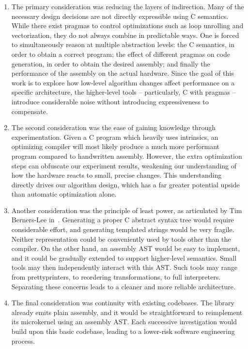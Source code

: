 \begin{enumerate}

\item The primary consideration was reducing the layers of indirection. Many of the necessary design decisions are not directly expressible using C semantics. While there exist pragmas to control optimizations such as loop unrolling and vectorization, they do not always combine in predictable ways. One is forced to simultaneously reason at multiple abstraction levels: the C semantics, in order to obtain a correct program; the effect of different pragmas on code generation, in order to obtain the desired assembly; and finally the performance of the assembly on the actual hardware. Since the goal of this work is to explore how low-level algorithm changes affect performance on a specific architecture, the higher-level tools -- particularly, C with pragmas -- introduce considerable noise without introducing expressiveness to compensate.

\item The second consideration was the ease of gaining knowledge through experimentation. Given a C program which heavily uses intrinsics, an optimizing compiler will most likely produce a much more performant program compared to handwritten assembly. However, the extra optimization steps can obfuscate our experiment results, weakening our understanding of how the hardware reacts to small, precise changes. This understanding directly drives our algorithm design, which has a far greater potential upside than automatic optimization alone.

\item Another consideration was the principle of least power, as articulated by Tim Berners-Lee in~\cite{PrincipleOfLeastPower}. Generating a proper C abstract syntax tree would require considerable effort, and generating templated strings would be very fragile. Neither representation could be conveniently used by tools other than the compiler. On the other hand, an assembly AST would be easy to implement, and it could be gradually extended to support higher-level semantics. Small tools may then independently interact with this AST. Such tools may range from prettyprinters, to reordering transformations, to full interpreters. Separating these concerns leads to a cleaner and more reliable architecture.

\item The final consideration was continuity with existing codebases. The  library already emits plain assembly, and it would be straightforward to reimplement its microkernel using an assembly AST. Each successive investigation would build upon this basic codebase, leading to a lower-risk software engineering process.

\end{enumerate}

